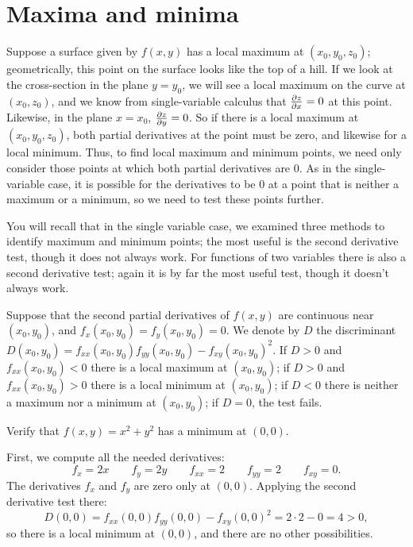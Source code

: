 \section{Maxima and minima}{}{}

Suppose a surface given by $f(x,y)$ has a local maximum at
$(x_0,y_0,z_0)$; geometrically, this point on the surface looks like
the top of a hill. If we look at the cross-section in the plane
$y=y_0$, we will see a local maximum on the curve at $(x_0,z_0)$, and
we know from single-variable calculus that ${\partial z\over\partial x}=0$
at this point. Likewise, in the plane $x=x_0$, ${\partial
  z\over\partial y}=0$. So if there is a local maximum at
$(x_0,y_0,z_0)$, both partial derivatives at the point must be zero,
and likewise for a local minimum. Thus, to find local maximum and
minimum points, we need only consider those points at which both
partial derivatives are 0. As in the single-variable case, it is
possible for the derivatives to be 0 at a point that is neither a
maximum or a minimum, so we need to test these points further.

You will recall that in the single variable case, we examined three
methods to identify maximum and minimum points; the most useful is the
second derivative test, though it does not always work. For functions
of two variables there is also a second derivative test; again it is
by far the most useful test, though it doesn't always work.

\begin{theorem} Suppose that the second partial derivatives of $f(x,y)$ are
continuous near $(x_0,y_0)$, and $f_x(x_0,y_0)=f_y(x_0,y_0)=0$.
We denote by $D$ the {\dfont discriminant}
$D(x_0,y_0)=f_{xx}(x_0,y_0)f_{yy}(x_0,y_0)-f_{xy}(x_0,y_0)^2$.
If $D>0$ and $f_{xx}(x_0,y_0)<0$ there is a local maximum at $(x_0,y_0)$;
if $D>0$ and $f_{xx}(x_0,y_0)>0$ there is a local minimum at $(x_0,y_0)$;
if $D<0$ there is neither a maximum nor a minimum at $(x_0,y_0)$;
if $D=0$, the test fails.
\end{theorem}

\begin{example} Verify that $f(x,y)=x^2+y^2$ has a minimum at $(0,0)$.

First, we compute all the needed derivatives:
$$f_x=2x \qquad f_y=2y \qquad f_{xx}=2 \qquad f_{yy}=2 \qquad
f_{xy}=0.$$
The derivatives $f_x$ and $f_y$ are zero only at $(0,0)$. Applying the
second derivative test there:
$$D(0,0)=f_{xx}(0,0)f_{yy}(0,0)-f_{xy}(0,0)^2=
2\cdot2-0=4>0,$$
so there is a local minimum at $(0,0)$, and there are no other
possibilities. 
\end{example}

